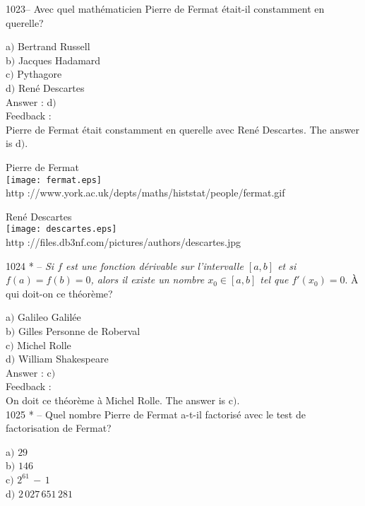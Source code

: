 \documentclass[letterpaper, 12pt]{article}
\begin{document}
1023-- Avec quel math\'ematicien Pierre de Fermat \'etait-il
constamment en querelle?

a$)$ Bertrand Russell \\
b$)$ Jacques Hadamard \\
c$)$ Pythagore \\
d$)$ Ren\'e Descartes\\

Answer : d$)$\\

Feedback : \\
Pierre de Fermat \'etait constamment en querelle avec Ren\'e
Descartes. The answer is d$)$.

        \begin{center}
        Pierre de Fermat\\
    \texttt{[image: fermat.eps]}\\
        {\footnotesize http
://www.york.ac.uk/depts/maths/histstat/people/fermat.gif}
    \end{center}

        \begin{center}
        Ren\'e Descartes\\
    \texttt{[image: descartes.eps]}\\
        {\footnotesize http
://files.db3nf.com/pictures/authors/descartes.jpg}
    \end{center}


1024 * -- {\sl Si $f$ est une fonction d\'erivable sur l'intervalle
$[a,b]$ et si $f(a)=f(b)=0$, alors il existe un nombre $x_0\in[a,b]$
tel que $f'(x_0)=0$}. \`A qui doit-on ce th\'eor\`eme?

a$)$ Galileo Galil\'ee \\
b$)$ Gilles Personne de Roberval \\
c$)$ Michel Rolle \\
d$)$ William Shakespeare\\

Answer : c$)$\\

Feedback : \\
On doit ce th\'eor\`eme \`a Michel Rolle.
The answer is c$)$.\\


1025 * -- Quel nombre Pierre de Fermat a-t-il factoris\'e avec le
test de factorisation de Fermat?

a$)$ $29$ \\
b$)$ $146$ \\
c$)$ $2^{61}\,-\,1$ \\
d$)$ $2\,027\,651\,281$\\
\end{document}
